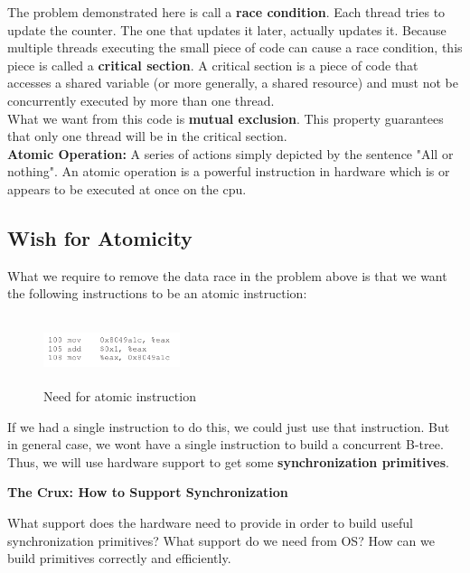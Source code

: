 The problem demonstrated here is call a \textbf{race condition}. Each thread
tries to update the counter. The one that updates it later, actually updates it.
Because multiple threads executing the small piece of code can cause a race
condition, this piece is called a \textbf{critical section}. A critical section
is a piece of code that accesses a shared variable (or more generally, 
a shared resource) and must not be concurrently executed by more than one
thread.\\

What we want from this code is \textbf{mutual exclusion}. This property 
guarantees that only one thread will be in the critical section.\\

\textbf{Atomic Operation:} A series of actions simply depicted by the 
sentence "All or nothing". An atomic operation is a powerful instruction in 
hardware which is or appears to be executed at once on the cpu.\\

\subsection{Wish for Atomicity}

What we require to remove the data race in the problem above is that we want
the following instructions to be an atomic instruction:

\begin{figure}[h!]
    \begin{center}
        \includegraphics[width=4cm, height=2cm]{img/atomicex.png}
        \caption{Need for atomic instruction}
    \end{center}
\end{figure}

If we had a single instruction to do this, we could just use that instruction.
But in general case, we wont have a single instruction to build a concurrent
B-tree. Thus, we will use hardware support to get some \textbf{synchronization
primitives}.

\begin{tcolorbox}
    \begin{center}
        \textbf{The Crux: How to Support Synchronization}
    \end{center}  

    What support does the hardware need to provide in order to build useful
    synchronization primitives? What support do we need from OS? How can we
    build primitives correctly and efficiently.
\end{tcolorbox}

